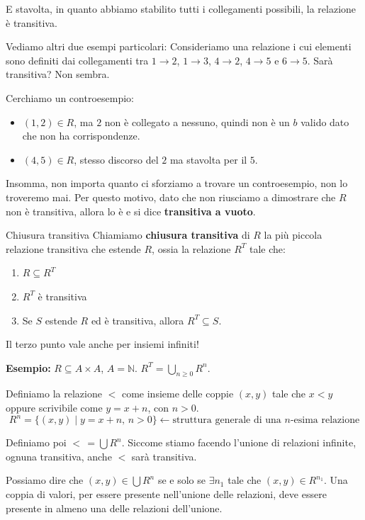 \documentclass[12pt]{report}
\newcommand{\N}{\mathbb{N}}
\begin{document}
	E stavolta, in quanto abbiamo stabilito tutti i collegamenti possibili, la relazione è transitiva.
	
	Vediamo altri due esempi particolari:
	Consideriamo una relazione i cui elementi sono definiti dai collegamenti tra $1 \to 2$, $1 \to 3$, $4 \to 2$, $4 \to 5$ e $6 \to 5$. Sarà transitiva? Non sembra.
	
	Cerchiamo un controesempio:
	\begin{itemize}
		\item $(1, 2) \in R$, ma $2$ non è collegato a nessuno, quindi non è un $b$ valido dato che non ha corrispondenze.
		\item $(4, 5) \in R$, stesso discorso del $2$ ma stavolta per il $5$.
	\end{itemize}
	
	Insomma, non importa quanto ci sforziamo a trovare un controesempio, non lo troveremo mai.
	Per questo motivo, dato che non riusciamo a dimostrare che $R$ non è transitiva, allora lo è e si dice \textbf{transitiva a vuoto}.
	
	\begin{definizione}{Chiusura transitiva}{}
		Chiamiamo \textbf{chiusura transitiva} di $R$ la più piccola relazione transitiva che estende $R$, ossia la relazione $R^T$ tale che:
		\begin{enumerate}
			\item $R \subseteq R^T$
			\item $R^T$ è transitiva
			\item Se $S$ estende $R$ ed è transitiva, allora $R^T \subseteq S$.
		\end{enumerate}
		Il terzo punto vale anche per insiemi infiniti!
	\end{definizione}
	
	\textbf{Esempio:} $R \subseteq A \times A$, $A = \N$. $R^T = \bigcup_{n \ge 0} R^n$.
	
	Definiamo la relazione $<$ come insieme delle coppie $(x, y)$ tale che $x < y$ oppure scrivibile come $y = x + n$, con $n > 0$.
	\[
	R^n = \{(x, y) \mid y = x + n, \, n > 0\} \longleftarrow \text{struttura generale di una $n$-esima relazione}
	\]
	
	Definiamo poi $<\, = \bigcup R^n$. Siccome stiamo facendo l'unione di relazioni infinite, ognuna transitiva, anche $<$ sarà transitiva.
	
	Possiamo dire che $(x, y) \in \bigcup R^n$ se e solo se $\exists n_1$ tale che $(x, y) \in R^{n_1}$.
	Una coppia di valori, per essere presente nell'unione delle relazioni, deve essere presente in almeno una delle relazioni dell'unione.
	
\end{document}
